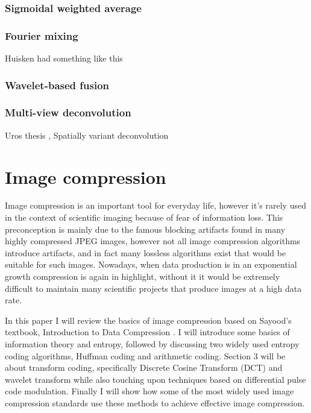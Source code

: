 \documentclass{diploma_style}
\begin{document}
		\subsubsection{Sigmoidal weighted average}
		\subsubsection{Fourier mixing}
		Huisken had something like this
		\subsubsection{Wavelet-based fusion}
		\subsubsection{Multi-view deconvolution}
		
		\cite{krzic_multiple-view_2009} Uros thesis
		\cite{temerinac-ott_multiview_2012}, \cite{temerinac-ott_spatially-variant_2011} Spatially variant deconvolution
		
		
\section{Image compression}
Image compression is an important tool for everyday life, however it's rarely used in the context of scientific imaging because of fear of information loss. This preconception is mainly due to the famous blocking artifacts found in many highly compressed JPEG images, however not all image compression algorithms introduce artifacts, and in fact many lossless algorithms exist that would be suitable for such images. Nowadays, when data production is in an exponential growth compression is again in highlight, without it it would be extremely difficult to maintain many scientific projects that produce images at a high data rate. 

In this paper I will review the basics of image compression based on Sayood's textbook, Introduction to Data Compression \cite{sayood_introduction_2012}. 
I will introduce some basics of information theory and entropy, followed by discussing two widely used entropy coding algorithms, Huffman coding and arithmetic coding. Section 3 will be about transform coding, specifically Discrete Cosine Transform (DCT) and wavelet transform while also touching upon techniques based on differential pulse code modulation. Finally I will show how some of the most widely used image compression standards use these methods to achieve effective image compression.
\end{document}
